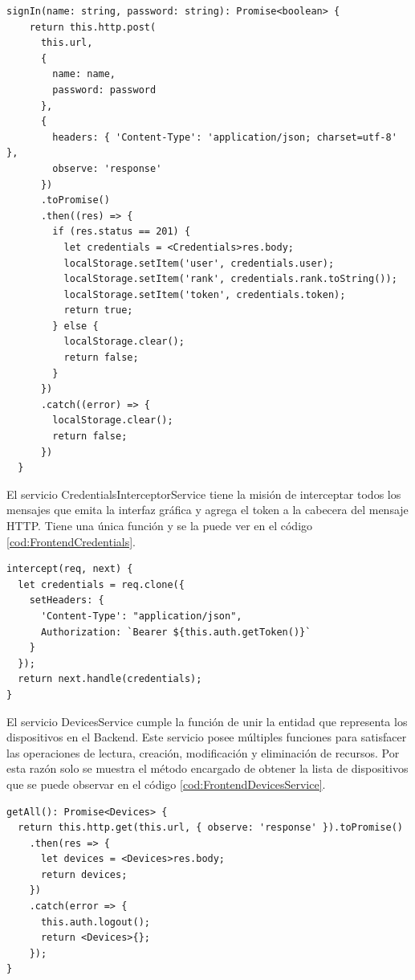 \newpage

\begin{lstlisting}[label=cod:FrontendAuthService,caption=Obtención de credenciales]
signIn(name: string, password: string): Promise<boolean> {
    return this.http.post(
      this.url,
      {
        name: name,
        password: password
      },
      {
        headers: { 'Content-Type': 'application/json; charset=utf-8' },
        observe: 'response'
      })
      .toPromise()
      .then((res) => {
        if (res.status == 201) {
          let credentials = <Credentials>res.body;
          localStorage.setItem('user', credentials.user);
          localStorage.setItem('rank', credentials.rank.toString());
          localStorage.setItem('token', credentials.token);
          return true;
        } else {
          localStorage.clear();
          return false;
        }
      })
      .catch((error) => {
        localStorage.clear();
        return false;
      })
  }
\end{lstlisting}

El servicio CredentialsInterceptorService tiene la misión de interceptar todos los mensajes que emita la interfaz gráfica y agrega el token a la cabecera del mensaje HTTP.
Tiene una única función y se la puede ver en el código \ref{cod:FrontendCredentials}.

\begin{lstlisting}[label=cod:FrontendCredentials,caption=Intercepción de mensajes]
intercept(req, next) {
  let credentials = req.clone({
    setHeaders: {
      'Content-Type': "application/json",
      Authorization: `Bearer ${this.auth.getToken()}`
    }
  });
  return next.handle(credentials);
}
\end{lstlisting}

El servicio DevicesService cumple la función de unir la entidad que representa los dispositivos en el Backend.
Este servicio posee múltiples funciones para satisfacer las operaciones de lectura, creación, modificación y eliminación de recursos.
Por esta razón solo se muestra el método encargado de obtener la lista de dispositivos que se puede observar en el código \ref{cod:FrontendDevicesService}.

\newpage

\begin{lstlisting}[label=cod:FrontendDevicesService,caption=Obtención de la lista de dispositivos]
getAll(): Promise<Devices> {
  return this.http.get(this.url, { observe: 'response' }).toPromise()
    .then(res => {
      let devices = <Devices>res.body;
      return devices;
    })
    .catch(error => {
      this.auth.logout();
      return <Devices>{};
    });
}
\end{lstlisting}

